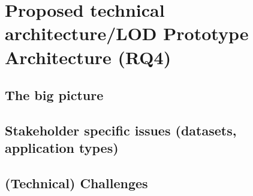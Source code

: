 \chapter{Proposed technical architecture/LOD Prototype Architecture (RQ4)}
\section{The big picture}
\section{Stakeholder specific issues (datasets, application types)}
\section{(Technical) Challenges}
